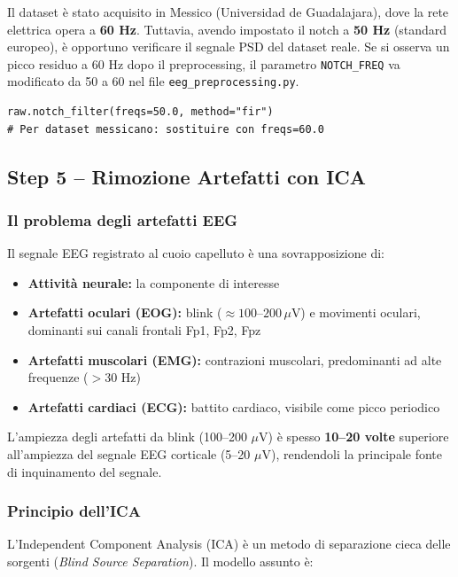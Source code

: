 \documentclass[12pt, a4paper]{article}
\begin{document}
\begin{notabox}
Il dataset è stato acquisito in Messico (Universidad de Guadalajara), dove la rete elettrica opera a \textbf{60 Hz}. Tuttavia, avendo impostato il notch a \textbf{50 Hz} (standard europeo), è opportuno verificare il segnale PSD del dataset reale. Se si osserva un picco residuo a 60 Hz dopo il preprocessing, il parametro \texttt{NOTCH\_FREQ} va modificato da 50 a 60 nel file \texttt{eeg\_preprocessing.py}.
\end{notabox}

\begin{lstlisting}[caption={Filtro notch}]
raw.notch_filter(freqs=50.0, method="fir")
# Per dataset messicano: sostituire con freqs=60.0
\end{lstlisting}

\subsection{Step 5 -- Rimozione Artefatti con ICA}

\subsubsection{Il problema degli artefatti EEG}
Il segnale EEG registrato al cuoio capelluto è una sovrapposizione di:
\begin{itemize}
    \item \textbf{Attività neurale:} la componente di interesse
    \item \textbf{Artefatti oculari (EOG):} blink ($\approx 100$--$200\,\mu$V) e movimenti oculari, dominanti sui canali frontali Fp1, Fp2, Fpz
    \item \textbf{Artefatti muscolari (EMG):} contrazioni muscolari, predominanti ad alte frequenze ($>30$ Hz)
    \item \textbf{Artefatti cardiaci (ECG):} battito cardiaco, visibile come picco periodico
\end{itemize}

L'ampiezza degli artefatti da blink (100--200 $\mu$V) è spesso \textbf{10--20 volte} superiore all'ampiezza del segnale EEG corticale (5--20 $\mu$V), rendendoli la principale fonte di inquinamento del segnale.

\subsubsection{Principio dell'ICA}
L'Independent Component Analysis (ICA) è un metodo di separazione cieca delle sorgenti (\textit{Blind Source Separation}). Il modello assunto è:
\end{document}
